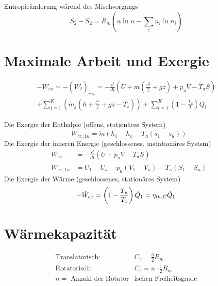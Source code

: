 \documentclass[twocolumn]{article}
\begin{document}
Entropieänderung wärend des Mischvorgangs
\begin{equation}
	S_2-S_2 = R_m \left ( n \ln n - \sum_{i}^{} n_i \ln n_i \right )
\end{equation}
\section{Maximale Arbeit und Exergie}

\begin{multline}
	-\dot{W}_{ex} = - (\dot{W}_t)_{rev} = -\frac{d}{dt} \left( U + m\left ( \frac{c^2}{2}+ gz \right) + p_uV - T_uS \right) \\  +  \sum_{j=1}^{K} \left(\dot{m}_j \left(h + \frac{c^2}{2} + gz -T_s \right) \right) + \sum_{l=1}^{K} \left( 1 - \frac{T_u}{T}\right) \dot{Q}_l 
\end{multline}

Die Exergie der Enthalpie (offens, stationäres System)
\begin{equation}
	-\dot{W}_{ex,1u} = \dot{m}(h_1 - h_u -T_u(s_1 - s_u))
\end{equation}
Die Exergie der inneren Energie (geschlossenes, instationäres System)
\begin{align}
	- \dot{W}_{ex} &= - \frac{d}{dt}(U + p_uV -T_uS) \\
	-\dot{W}_{ex,1u} &= U_1 - U_u -p_u(V_1 - V_u) - T_u(S_1 - S_u)
\end{align}
Die Exergie der Wärme (geschlossenes, stationäres System)
\begin{equation}
	- \dot{W}_{ex} = \left(1 - \frac{T_u}{T_1} \right) \dot{Q}_1 = \eta_{th,C} \dot{Q}_1 \\
\end{equation}

\section{Wärmekapazität}

\begin{align*}
	\text{Translatorisch: }  &C_v = \frac{3}{2} R_m  \\
	 \text{Rotatorisch: }  &C_v = n \cdot \frac{1}{2} R_m \\
	 n = \text{ Anzahl der Rotator} & \text{ischen Freiheitsgrade} \\
\end{align*}
\end{document}
